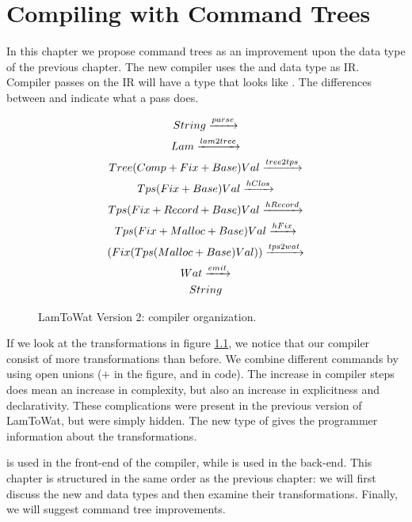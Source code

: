 
\chapter{\label{chap:treecomp}Compiling with Command Trees}

In this chapter we propose command trees as an improvement upon the  data type of the previous chapter. The new compiler uses the  and  data type as IR. Compiler passes on the IR will have a type that looks like . The differences between  and  indicate what a pass does.

\begin{figure}
\begin{gather*}
  String \xrightarrow{parse}\\
  Lam \xrightarrow{lam2tree}\\
  Tree  (Comp + Fix + Base) Val \xrightarrow{tree2tps}\\
  Tps          (Fix + Base) Val \xrightarrow{hClos}\\
  Tps (Fix + Record + Base) Val \xrightarrow{hRecord}\\
  Tps (Fix + Malloc + Base) Val \xrightarrow{hFix}\\
  (Fix (Tps (Malloc + Base) Val)) \xrightarrow{tps2wat}\\
  Wat \xrightarrow{emit}\\
  String
\end{gather*}
\caption{LamToWat Version 2: compiler organization.}
\label{fig:lam2watv2org}
\end{figure}

If we look at the transformations in figure \ref{fig:lam2watv2org}, we notice that our compiler consist of more transformations than before. We combine different commands by using open unions ($+$ in the figure, and \icode{:+:} in code). The increase in compiler steps does mean an increase in complexity, but also an increase in explicitness and declarativity. These complications were present in the previous version of LamToWat, but were simply hidden. The new type of  gives the programmer information about the transformations. 

 is used in the front-end of the compiler, while  is used in the back-end. This chapter is structured in the same order as the previous chapter: we will first discuss the new  and  data types and then examine their transformations. Finally, we will suggest command tree improvements.

